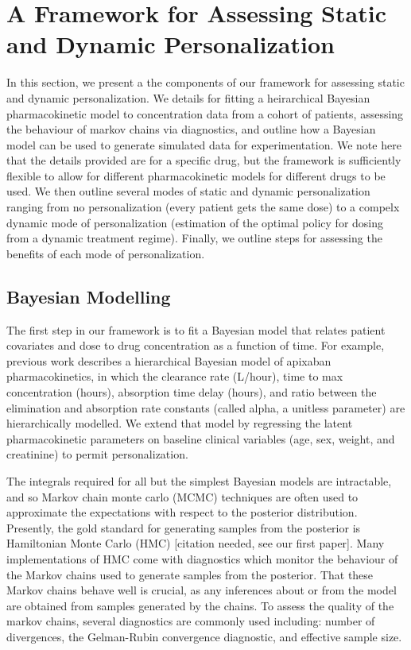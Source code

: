 \section{A Framework for Assessing Static and Dynamic Personalization}\label{ss:framework}

In this section, we present a the components of our framework for assessing static and dynamic personalization.  We details for fitting a heirarchical Bayesian pharmacokinetic model to concentration data from a cohort of patients, assessing the behaviour of markov chains via diagnostics, and outline how a Bayesian model can be used to generate simulated data for experimentation.  We note here that the details provided are for a specific drug, but the framework is sufficiently flexible to allow for different pharmacokinetic models for different drugs to be used. We then outline several modes of static and dynamic personalization ranging from no personalization (every patient gets the same dose) to a compelx dynamic mode of personalization (estimation of the optimal policy for dosing from a dynamic treatment regime).  Finally, we outline steps for assessing the benefits of each mode of personalization.

\subsection{Bayesian Modelling}

The first step in our framework is to fit a Bayesian model that relates patient covariates and dose to drug concentration as a function of time. For example, previous work \cite{pananos2020comparisons} describes a hierarchical Bayesian model of apixaban pharmacokinetics, in which the clearance rate (L/hour), time to max concentration (hours), absorption time delay (hours), and ratio between the elimination and absorption rate constants (called alpha, a unitless parameter) are hierarchically modelled.  We extend that model by regressing the latent pharmacokinetic parameters on baseline clinical variables (age, sex, weight, and creatinine) to permit personalization.

The integrals required for all but the simplest Bayesian models are intractable, and so Markov chain monte carlo (MCMC) techniques are often used to approximate the expectations with respect to the posterior distribution.  Presently, the gold standard for generating samples from the posterior is Hamiltonian Monte Carlo (HMC) [citation needed, see our first paper].  Many implementations of HMC come with diagnostics which monitor the behaviour of the Markov chains used to generate samples from the posterior. That these Markov chains behave well is crucial, as any inferences about or from the model are obtained from samples generated by the chains. To assess the quality of the markov chains, several diagnostics are commonly used including: number of divergences, the Gelman-Rubin convergence diagnostic, and effective sample size.  

